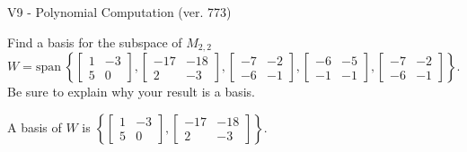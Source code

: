 \begin{exercise}
  \begin{exerciseTitle}V9 - Polynomial Computation (ver. 773)\end{exerciseTitle}
  \begin{exerciseStatement}
    Find a basis for the subspace of \(M_{2,2}\) 
\[W=\mathrm{span}\ \left\{\left[\begin{array}{cc}
1 & -3 \\
5 & 0
\end{array}\right] , \left[\begin{array}{cc}
-17 & -18 \\
2 & -3
\end{array}\right] , \left[\begin{array}{cc}
-7 & -2 \\
-6 & -1
\end{array}\right] , \left[\begin{array}{cc}
-6 & -5 \\
-1 & -1
\end{array}\right] , \left[\begin{array}{cc}
-7 & -2 \\
-6 & -1
\end{array}\right]\right\}.\]
 Be sure to explain why your result is a basis.


  \end{exerciseStatement}
  \begin{exerciseAnswer}
   A basis of \(W\) is  \(\left\{\left[\begin{array}{cc}
1 & -3 \\
5 & 0
\end{array}\right] , \left[\begin{array}{cc}
-17 & -18 \\
2 & -3
\end{array}\right]\right\}\).
  


  \end{exerciseAnswer}
\end{exercise}
